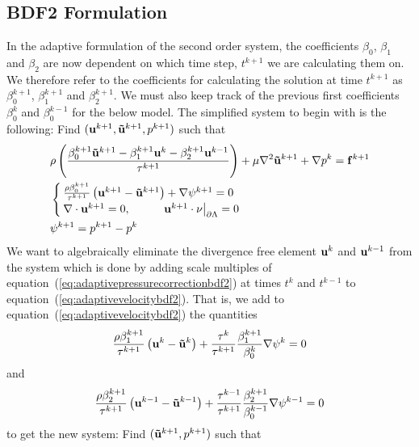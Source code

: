 \documentclass[letterpaper]{erdc}
\begin{document}
\subsection{BDF2 Formulation}
In the adaptive formulation of the second order system, the coefficients $\beta_0$, $\beta_1$ and $\beta_2$ are now dependent on which time step, $t^{k+1}$ we are calculating them on.  We therefore refer to the coefficients for calculating the solution at time $t^{k+1}$ as $\beta_0^{k+1}$, $\beta_1^{k+1}$ and $\beta_2^{k+1}$.  We must also keep track of the previous first coefficients $\beta_0^{k}$ and $\beta_0^{k-1}$ for the below model.  The simplified system to begin with is the following:  Find $(\textbf{u}^{k+1},\mathbf{\tilde{u}}^{k+1},p^{k+1})$ such that
\begin{align}
  &\rho\left( \frac{\beta_0^{k+1}\mathbf{\tilde{u}}^{k+1} - \beta_1^{k+1}\textbf{u}^{k} - \beta_2^{k+1}\textbf{u}^{k-1}}{\tau^{k+1}} \right) + \mu\nabla^2 \mathbf{\tilde{u}}^{k+1} + \nabla p^{k} = \mathbf{f}^{k+1}\label{eq:adaptivevelocitybdf2}\\
  &\begin{cases}
    \frac{\rho\beta_0^{k+1}}{\tau^{k+1}}\left( \textbf{u}^{k+1}-\mathbf{\tilde{u}}^{k+1}\right) + \nabla\psi^{k+1} = 0\\
    \nabla\cdot\textbf{u}^{k+1} = 0, \hspace{1cm} \left.\textbf{u}^{k+1}\cdot\nu\right|_{\partial\Lambda}=0
    \end{cases}\label{eq:adaptivepressurecorrectionbdf2}\\
  & \psi^{k+1} = p^{k+1} - p^{k}
\end{align}
We want to algebraically eliminate the divergence free element $\textbf{u}^{k}$ and $\textbf{u}^{k-1}$ from the system which is done by adding scale multiples of equation~(\ref{eq:adaptivepressurecorrectionbdf2}) at times $t^{k}$ and $t^{k-1}$ to equation~(\ref{eq:adaptivevelocitybdf2}).  That is, we add to equation~(\ref{eq:adaptivevelocitybdf2}) the quantities
\begin{equation*}
  \frac{\rho\beta_1^{k+1}}{\tau^{k+1}}\left( \textbf{u}^{k} - \mathbf{\tilde{u}}^{k} \right) + \frac{\tau^{k}}{\tau^{k+1}}\frac{\beta_1^{k+1}}{\beta_0^{k}}\nabla\psi^{k} = 0
\end{equation*}
and 
\begin{equation*}
  \frac{\rho\beta_2^{k+1}}{\tau^{k+1}}\left( \textbf{u}^{k-1} - \mathbf{\tilde{u}}^{k-1} \right) + \frac{\tau^{k-1}}{\tau^{k+1}}\frac{\beta_2^{k+1}}{\beta_0^{k-1}}\nabla\psi^{k-1} = 0
\end{equation*}
to get the new system:  Find $(\mathbf{\tilde{u}}^{k+1},p^{k+1})$ such that
\end{document}
